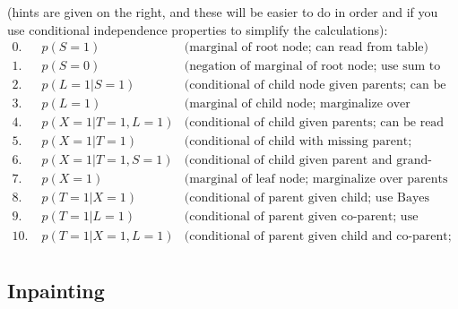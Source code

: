 \documentclass{article}
\begin{document}
 (hints are given on the right, and these will be easier to do in order and if you use conditional independence properties to simplify the calculations):
\begin{align*}
0.\; & p(S = 1) & \text{(marginal of root node; can read from table)}\\
1.\; & p(S = 0) & \text{(negation of marginal of root node; use sum to one constraint)}\\
2.\; & p(L = 1 | S = 1) & \text{(conditional of child node given parents; can be read from table)}\\
3.\; & p(L = 1) & \text{(marginal of child node; marginalize over parent)}\\
4.\; & p(X=1|T=1,L=1) & \text{(conditional of child given parents; can be read from table)}\\
5.\; & p(X = 1 | T = 1) & \text{(conditional of child with missing parent; marginalize over missing parent)}\\
6.\; & p(X=1|T=1,S=1) & \text{(conditional of child given parent and grand-parent, marginalize over missing parent)}\\
7.\; & p(X = 1) & \text{(marginal of leaf node; marginalize over parents and use independence to simplify)}\\
8.\; & p(T = 1 | X = 1) & \text{(conditional of parent given child; use Bayes rule)}\\
9.\; & p(T = 1 | L = 1) & \text{(conditional of parent given co-parent; use independence and then marginal)}\\
10.\; & p(T = 1 | X = 1, L = 1) & \text{(conditional of parent given child and co-parent; use Bayes rule)}\\
\end{align*}



\subsection{Inpainting}
\end{document}
